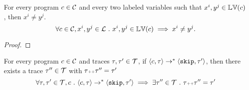 \begin{lem}
    For every program $c \in \mathcal{C}$ and every two labeled variables such that
    $x^i, y^j \in \mathbb{LV}(c)$, then $x^i \neq y^j$.
    \[
      \forall c \in \mathcal{C}, x^i, y^j \in \mathcal{L} ~.~ x^i, y^j \in \mathbb{LV}(c)\implies x^i \neq y^j.
      \]
  \end{lem}
  \begin{proof}
  \end{proof}
  \begin{lem}
    For every program $c \in \mathcal{C}$ and traces $\mathtt{\tau}, \mathtt{\tau}' \in \mathcal{T}$, if 
    $\langle c, \mathtt{\tau} \rangle \rightarrow^{*} \langle \mathtt{skip}, \mathtt{\tau}' \rangle$,
    then there exists a trace $\mathtt{\tau}'' \in \mathcal{T}$ with $\mathtt{\tau} {\scriptscriptstyle ++} \mathtt{\tau}'' = \mathtt{\tau}'$
    $$
    \forall \mathtt{\tau}, \mathtt{\tau}' \in \mathcal{T}, c ~.~
    \langle c, \mathtt{\tau} \rangle \rightarrow^{*} \langle \mathtt{skip}, \mathtt{\tau}' \rangle 
    \implies \exists \mathtt{\tau}'' \in \mathcal{T} ~.~ \mathtt{\tau} {\scriptscriptstyle ++} \mathtt{\tau}'' = \mathtt{\tau}'
    $$
    \end{lem}

